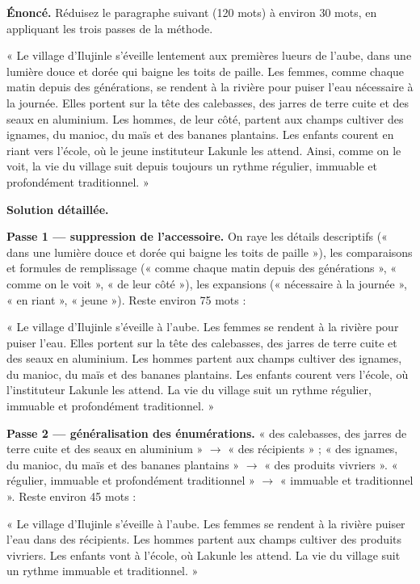 \documentclass[11pt]{article}
\begin{document}
\begin{exoresolu}
\textbf{Énoncé.} Réduisez le paragraphe suivant (120 mots) à environ 30 mots, en appliquant les trois passes de la méthode.

« Le village d'Ilujinle s'éveille lentement aux premières lueurs de l'aube, dans une lumière douce et dorée qui baigne les toits de paille. Les femmes, comme chaque matin depuis des générations, se rendent à la rivière pour puiser l'eau nécessaire à la journée. Elles portent sur la tête des calebasses, des jarres de terre cuite et des seaux en aluminium. Les hommes, de leur côté, partent aux champs cultiver des ignames, du manioc, du maïs et des bananes plantains. Les enfants courent en riant vers l'école, où le jeune instituteur Lakunle les attend. Ainsi, comme on le voit, la vie du village suit depuis toujours un rythme régulier, immuable et profondément traditionnel. »

\tcblower

\textbf{Solution détaillée.}

\textbf{Passe 1 — suppression de l'accessoire.} On raye les détails descriptifs (« dans une lumière douce et dorée qui baigne les toits de paille »), les comparaisons et formules de remplissage (« comme chaque matin depuis des générations », « comme on le voit », « de leur côté »), les expansions (« nécessaire à la journée », « en riant », « jeune »). Reste environ 75 mots :

« Le village d'Ilujinle s'éveille à l'aube. Les femmes se rendent à la rivière pour puiser l'eau. Elles portent sur la tête des calebasses, des jarres de terre cuite et des seaux en aluminium. Les hommes partent aux champs cultiver des ignames, du manioc, du maïs et des bananes plantains. Les enfants courent vers l'école, où l'instituteur Lakunle les attend. La vie du village suit un rythme régulier, immuable et profondément traditionnel. »

\textbf{Passe 2 — généralisation des énumérations.} « des calebasses, des jarres de terre cuite et des seaux en aluminium » $\rightarrow$ « des récipients » ; « des ignames, du manioc, du maïs et des bananes plantains » $\rightarrow$ « des produits vivriers ». « régulier, immuable et profondément traditionnel » $\rightarrow$ « immuable et traditionnel ». Reste environ 45 mots :

« Le village d'Ilujinle s'éveille à l'aube. Les femmes se rendent à la rivière puiser l'eau dans des récipients. Les hommes partent aux champs cultiver des produits vivriers. Les enfants vont à l'école, où Lakunle les attend. La vie du village suit un rythme immuable et traditionnel. »


\end{exoresolu}
\end{document}
